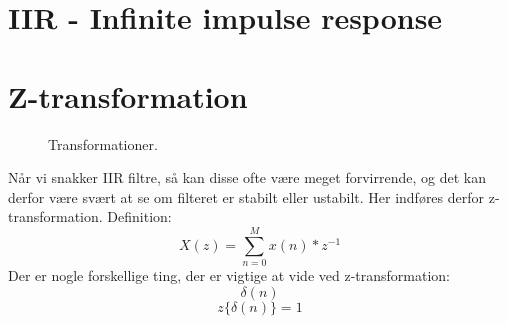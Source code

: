 \documentclass[12pt, letterpaper]{article}
\begin{document}
\section{IIR - Infinite impulse response}

\section{Z-transformation}

\begin{figure}[!h]
           \begin{floatrow}
             		   			{\caption{Transformationer.}}
           \end{floatrow}
\end{figure}


Når vi snakker IIR filtre, så kan disse ofte være meget forvirrende, og det kan derfor være svært at se om filteret er stabilt eller ustabilt. Her indføres derfor z-transformation. 
Definition: 
$$ X(z)= \sum\limits_{n=0}^{M} x(n)*z^{-1}$$
Der er nogle forskellige ting, der er vigtige at vide ved z-transformation: 
$$\delta(n)$$
$$ z{\{\delta(n)}\}=1$$
\end{document}
